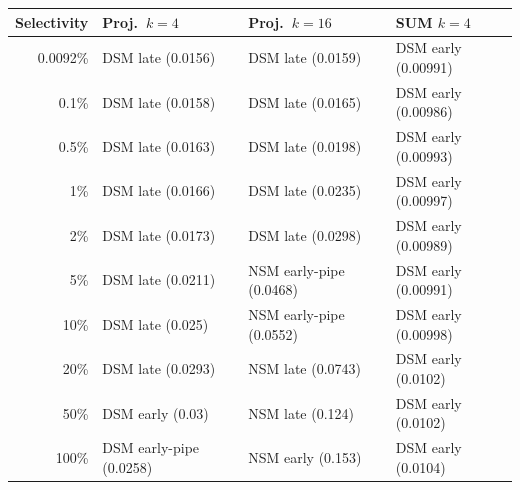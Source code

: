 \begin{tabular}{rlll}
\toprule
Selectivity & Proj.\ $k{=}4$ & Proj.\ $k{=}16$ & SUM $k{=}4$ \\
\midrule
0.0092\% & DSM late (0.0156) & DSM late (0.0159) & DSM early (0.00991) \\
0.1\% & DSM late (0.0158) & DSM late (0.0165) & DSM early (0.00986) \\
0.5\% & DSM late (0.0163) & DSM late (0.0198) & DSM early (0.00993) \\
1\% & DSM late (0.0166) & DSM late (0.0235) & DSM early (0.00997) \\
2\% & DSM late (0.0173) & DSM late (0.0298) & DSM early (0.00989) \\
5\% & DSM late (0.0211) & NSM early-pipe (0.0468) & DSM early (0.00991) \\
10\% & DSM late (0.025) & NSM early-pipe (0.0552) & DSM early (0.00998) \\
20\% & DSM late (0.0293) & NSM late (0.0743) & DSM early (0.0102) \\
50\% & DSM early (0.03) & NSM late (0.124) & DSM early (0.0102) \\
100\% & DSM early-pipe (0.0258) & NSM early (0.153) & DSM early (0.0104) \\
\bottomrule
\end{tabular}
